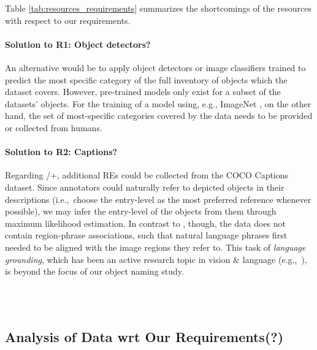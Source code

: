 {\noindent

Table \ref{tab:resources_requirements} summarizes the shortcomings of the resources with respect to our requirements. 

\paragraph{Solution to R1: Object detectors?}
An alternative would be to apply object detectors or image classifiers trained to predict the most specific category of the full inventory of objects which the dataset covers. 
However, pre-trained models only exist for a subset of the datasets' objects. 
For the training of a model using, e.g., ImageNet \cite{imagenet_cvpr09}, on the other hand, the  set of most-specific categories covered by the data needs to be provided or collected from humans. 

\paragraph{Solution to R2: Captions?}
Regarding /+, additional REs could be collected from the COCO Captions dataset. %
Since annotators could naturally refer to depicted objects in their descriptions (i.e.,~choose the entry-level as the most preferred reference whenever possible), we may infer the entry-level of the objects from them through maximum likelihood estimation. 
%
In contrast to \flickr, though, the data does not contain region-phrase associations,  %
such that natural language phrases first needed to be aligned with the image regions they refer to. 
This task of \textit{language grounding}, which has been an active research topic in vision \& language (e.g.,~\cite{kong2014what,karpathy2015deep,rohrbach2016grounding}), is beyond the focus of our object naming study. 

\\\\

\subsection{Analysis of Data wrt Our Requirements(?)}

}
